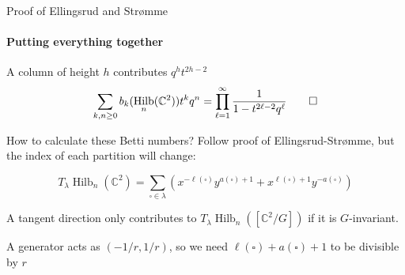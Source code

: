 \documentclass{beamer}
\DeclareMathOperator{\Hilb}{Hilb}
\newcommand{\C}{\mathbb{C}}
\newcommand{\Z}{\mathbb{Z}}
\begin{document}
\begin{frame}{Proof of Ellingsrud and Str\o mme}
\framesubtitle{Putting everything together}

\begin{center}
\end{center}

A column of height $h$ contributes $q^ht^{2h-2}$
$$\sum_{k,n \geq 0} b_k(\Hilb_n(\C^2))t^k q^n=\prod_{\ell=1}^\infty \frac{1}{1-t^{2\ell-2}q^\ell}\qed$$


\end{frame}







\begin{frame}{How to calculate these Betti numbers?}
Follow proof of Ellingsrud-Str\o mme, but the index of each partition will change:

\begin{Lemma}
$$T_\lambda \Hilb_n(\C^2)=\sum_{\square\in\lambda} \left(x^{-\ell(\square)} y^{a(\square)+1}+x^{\ell(\square)+1}y^{-a(\square)}\right)$$
\end{Lemma}

A tangent direction only contributes to $T_\lambda \Hilb_n([\C^2/G])$ if it is $G$-invariant.  
\begin{example}[Balanced $\Z_r$ action]
A generator acts as $(-1/r,1/r)$, so we need $\ell(\square)+a(\square)+1$ to be divisible by $r$
\end{example}

\end{frame}
\end{document}
